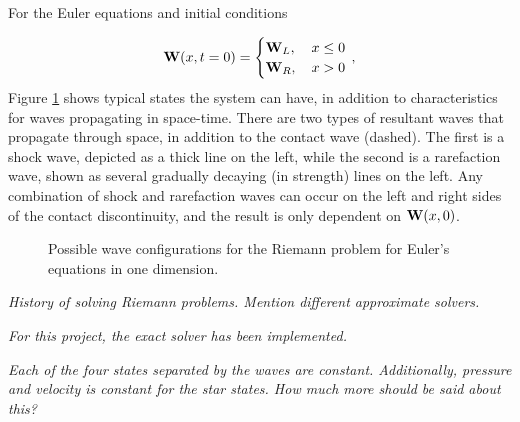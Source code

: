 \documentclass[final,3p,twocolumn]{elsarticle}
\begin{document}
For the Euler equations and initial conditions 

\begin{equation*}
    {\bf W}(x,t=0) = 
    \begin{cases}
        {\bf W}_L, \,&x \leq 0 \\ 
        {\bf W}_R, \,&x > 0 \\ 
    \end{cases} \,,
\end{equation*}
%
Figure \ref{fig:riemann} shows typical states the system can have, in addition
to characteristics for waves propagating in space-time. There are two types of
resultant waves that propagate through space, in addition to the contact wave
(dashed). The first is a shock wave, depicted as a thick line on the left,
while the second is a rarefaction wave, shown as several gradually decaying (in
strength) lines on the left. Any combination of shock and rarefaction waves can
occur on the left and right sides of the contact discontinuity, and the result
is only dependent on ${\bf W}(x,0)$. 

\begin{figure}[htb]
    \centering
    \caption{Possible wave configurations for the Riemann problem for Euler's
    equations in one dimension.}
    \label{fig:riemann}
\end{figure}

\emph{History of solving Riemann problems. Mention different approximate
solvers.}

\emph{For this project, the exact solver has been implemented.}

\emph{Each of the four states separated by the waves are constant.
Additionally, pressure and velocity is constant for the star states. How much
more should be said about this? }
\end{document}
